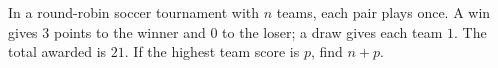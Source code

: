 In a round-robin soccer tournament with $n$ teams, each pair plays once. A win gives $3$ points to the winner and $0$ to the loser; a draw gives each team $1$. The total awarded is $21$. If the highest team score is $p$, find $n+p$.

